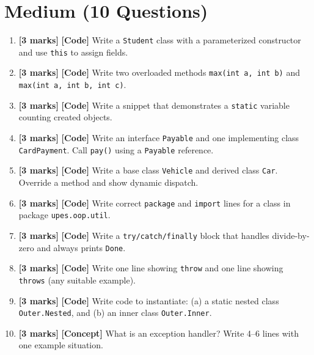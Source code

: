\documentclass[11pt,a4paper]{article}
\newcommand{\MMarks}{\textbf{[3 marks]} }
\begin{document}
\section*{Medium (10 Questions)}
\begin{enumerate}[label=\textbf{M\arabic*.}, leftmargin=*]
  \item \MMarks \textbf{[Code]} Write a \texttt{Student} class with a parameterized constructor and use \texttt{this} to assign fields.

  \item \MMarks \textbf{[Code]} Write two overloaded methods \texttt{max(int a, int b)} and \texttt{max(int a, int b, int c)}.

  \item \MMarks \textbf{[Code]} Write a snippet that demonstrates a \texttt{static} variable counting created objects.

  \item \MMarks \textbf{[Code]} Write an interface \texttt{Payable} and one implementing class \texttt{CardPayment}. Call \texttt{pay()} using a \texttt{Payable} reference.

  \item \MMarks \textbf{[Code]} Write a base class \texttt{Vehicle} and derived class \texttt{Car}. Override a method and show dynamic dispatch.

  \item \MMarks \textbf{[Code]} Write correct \texttt{package} and \texttt{import} lines for a class in package \texttt{upes.oop.util}.

  \item \MMarks \textbf{[Code]} Write a \texttt{try/catch/finally} block that handles divide-by-zero and always prints \texttt{Done}.

  \item \MMarks \textbf{[Code]} Write one line showing \texttt{throw} and one line showing \texttt{throws} (any suitable example).

  \item \MMarks \textbf{[Code]} Write code to instantiate:
    (a) a static nested class \texttt{Outer.Nested}, and
    (b) an inner class \texttt{Outer.Inner}.

  \item \MMarks \textbf{[Concept]} What is an exception handler? Write 4--6 lines with one example situation.
\end{enumerate}
\end{document}
